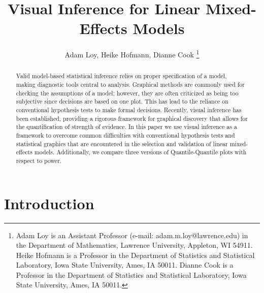 \documentclass[12pt]{article} %
\title{Visual Inference for Linear Mixed-Effects Models}
\author{{Adam Loy, Heike Hofmann, Dianne Cook}
\thanks{Adam Loy is an Assistant Professor (e-mail: adam.m.loy@lawrence.edu) in the Department of Mathematics, Lawrence University, Appleton, WI 54911. Heike Hofmann is a Professor in the Department of Statistics and Statistical Laboratory, Iowa State University, Ames, IA 50011. Dianne Cook is a Professor in the Department of Statistics and Statistical Laboratory, Iowa State University, Ames, IA 50011.}}
\newcommand{\hhnote}[1]{\todo[inline,color=orange!40]{#1}}
\begin{document}
\maketitle
\begin{abstract}
Valid model-based statistical inference relies on proper specification of a model, making diagnostic tools central to analysis. Graphical methods are commonly used for checking the assumptions of a model; however, they are often criticized as being too subjective since decisions are based on one plot. This has lead to the reliance on conventional hypothesis tests to make formal decisions. Recently, visual inference has been established, providing a rigorous framework for graphical discovery that allows for the quantification of strength of evidence. In this paper we use visual inference as a framework to overcome common difficulties with conventional hypothesis tests and statistical graphics that are encountered in the selection and validation of linear mixed-effects models. Additionally, we compare three versions of Quantile-Quantile plots with respect to power.
\end{abstract}

\section{Introduction}
\end{document}
